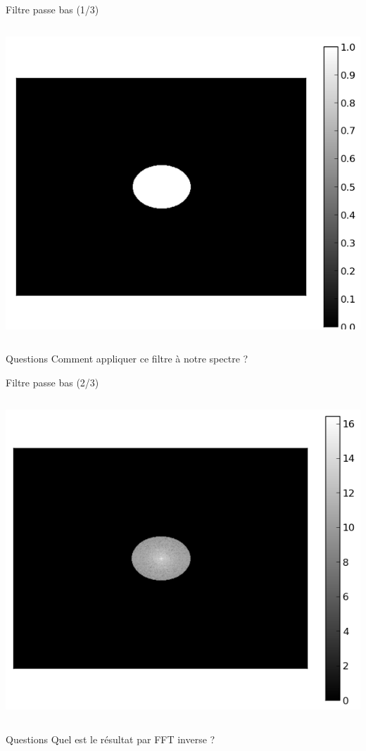 \documentclass[8pt,a4paper]{beamer}
\begin{document}
\begin{frame}{Filtre passe bas (1/3)}
 \begin{columns}
\includegraphics[width=1.\textwidth]{figures/lapin_lowpass.png}

\end{columns}
\begin{alertblock}{Questions}
Comment appliquer ce filtre à notre spectre ?
\end{alertblock}
\end{frame}

\begin{frame}{Filtre passe bas (2/3)}
 \begin{columns}
\includegraphics[width=1.\textwidth]{figures/lapin_lowpass2.png}

\end{columns}
\begin{alertblock}{Questions}
Quel est le résultat par FFT inverse ?
\end{alertblock}
\end{frame}
\end{document}
